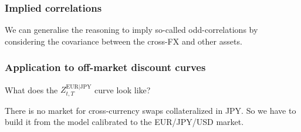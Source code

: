 \documentclass[11pt,english]{amsart}
\newcommand{\BS}{\mathrm{BS}}
\theoremstyle{definition}
\newtheorem{prop}{Proposition}
\newtheorem{coro}{Corrolary}
\begin{document}
%

\subsubsection{Implied correlations}
We can generalise the reasoning to imply so-called odd-correlations by considering the covariance between the cross-FX and other assets.



\subsubsection{Application to off-market discount curves}%

What does the $Z^{\mathrm{EUR}|\mathrm{JPY}}_{t,T}$ curve look like? 

There is no market for cross-currency swaps collateralized in JPY. So we have to build it from the model calibrated to the EUR/JPY/USD market.




\end{document}
